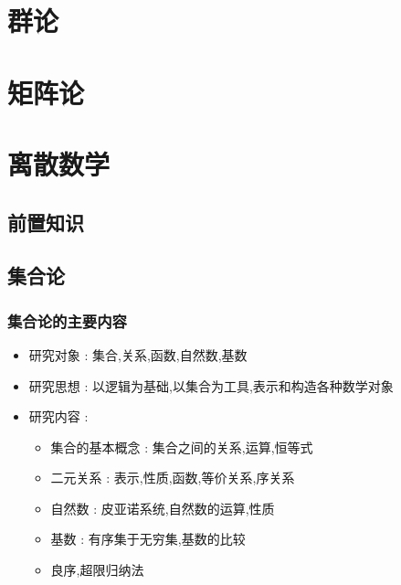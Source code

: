 \documentclass[UTF8,12pt]{ctexbook}
\begin{document}
{{{{  }%


 }%

\section{群论}{

 }%

\section{矩阵论}{

 }%

\section{离散数学}{

\subsection{前置知识}

\subsection{集合论}{

\subsubsection{集合论的主要内容}{
  \begin{itemize}
    \item 研究对象 : 集合,关系,函数,自然数,基数
    \item 研究思想 : 以逻辑为基础,以集合为工具,表示和构造各种数学对象
    \item 研究内容 : \begin{itemize}
            \item 集合的基本概念 : 集合之间的关系,运算,恒等式
            \item 二元关系 : 表示,性质,函数,等价关系,序关系
            \item 自然数 : 皮亚诺系统,自然数的运算,性质
            \item 基数 : 有序集于无穷集,基数的比较
            \item 良序,超限归纳法
          \end{itemize}
  \end{itemize}
}%

}}}}
\end{document}
